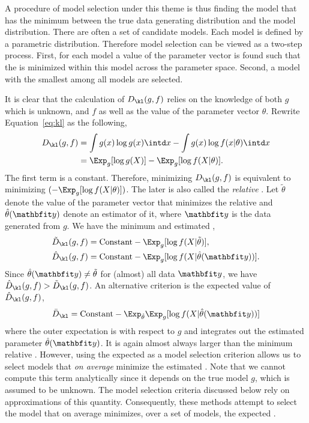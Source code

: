A procedure of model selection under this theme is thus finding the model
that has the minimum \kld between the true data generating distribution and
the model distribution. There are often a set of candidate models. Each model
is defined by a parametric distribution. Therefore model selection can be
viewed as a two-step process. First, for each model a value of the parameter
vector is found such that the \kld is minimized within this model across the
parameter space. Second, a model with the smallest \kld among all models are
selected.

It is clear that the calculation of $D_{\kl}(g,f)$ relies on the knowledge of
both $g$ which is unknown, and $f$ as well as the value of the parameter
vector $\theta$. Rewrite Equation~\eqref{eq:kl} as the following,
\begin{align}
  D_{\kl}(g,f)
  &= \int g(x)\log g(x) \intd x - \int g(x) \log f(x|\theta) \intd x \notag\\
  &= \Exp_g[\log g(X)] - \Exp_g[\log f(X|\theta)].
\end{align}
The first term is a constant. Therefore, minimizing $D_{\kl}(g,f)$ is
equivalent to minimizing $(-\Exp_g[\log f(X|\theta)])$. The later is also
called the \emph{relative} \kldfull. Let $\tilde\theta$ denote the value of
the parameter vector that minimizes the relative \kld and $\hat\theta(\data)$
denote an estimator of it, where $\data$ is the data generated from $g$. We
have the minimum and estimated \kld,
\begin{align}
  \tilde{D}_{\kl}(g,f) &= \text{Constant} - \Exp_g[\log f(X|\tilde\theta)], \\
  \hat{D}_{\kl}(g,f) &= \text{Constant} - \Exp_g[\log f(X|\hat\theta(\data))].
\end{align}
Since $\hat\theta(\data)\ne\tilde\theta$ for (almost) all data $\data$, we
have $\hat{D}_{\kl}(g,f) > \tilde{D}_{\kl}(g,f)$. An alternative criterion is
the expected value of $\hat{D}_{\kl}(g,f)$,
\begin{equation}
  \bar{D}_{\kl} = \text{Constant} -
  \Exp_{\hat\theta}\Exp_g[\log f(X|\hat\theta(\data))]
  \label{eq:expected kl}
\end{equation}
where the outer expectation is with respect to $g$ and integrates out the
estimated parameter $\hat\theta(\data)$. It is again almost always larger than
the minimum relative \kld. However, using the expected \kld as a model
selection criterion allows us to select models that \emph{on average} minimize
the estimated \kld. Note that we cannot compute this term analytically since
it depends on the true model $g$, which is assumed to be unknown. The model
selection criteria discussed below rely on approximations of this quantity.
Consequently, these methods attempt to select the model that on average
minimizes, over a set of models, the expected \kld.

